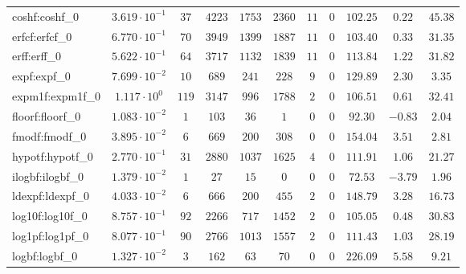 \begin{tabular}{|l|c|c|c|c|c|c|c|c|c|c|}
coshf:coshf\_0               & $ 3.619 \cdot 10^{-1} $ & $ 37     $ & $ 4223  $ & $ 1753  $ & $ 2360  $ & $ 11  $ & $ 0 $ & $ 102.25      $ & $ 0.22    $ & $ 45.38   $ \\
erfcf:erfcf\_0               & $ 6.770 \cdot 10^{-1} $ & $ 70     $ & $ 3949  $ & $ 1399  $ & $ 1887  $ & $ 11  $ & $ 0 $ & $ 103.40      $ & $ 0.33    $ & $ 31.35   $ \\
erff:erff\_0                 & $ 5.622 \cdot 10^{-1} $ & $ 64     $ & $ 3717  $ & $ 1132  $ & $ 1839  $ & $ 11  $ & $ 0 $ & $ 113.84      $ & $ 1.22    $ & $ 31.82   $ \\
expf:expf\_0                 & $ 7.699 \cdot 10^{-2} $ & $ 10     $ & $ 689   $ & $ 241   $ & $ 228   $ & $ 9   $ & $ 0 $ & $ 129.89      $ & $ 2.30    $ & $ 3.35    $ \\
expm1f:expm1f\_0             & $ 1.117 \cdot 10^{0}  $ & $ 119    $ & $ 3147  $ & $ 996   $ & $ 1788  $ & $ 2   $ & $ 0 $ & $ 106.51      $ & $ 0.61    $ & $ 32.41   $ \\
floorf:floorf\_0             & $ 1.083 \cdot 10^{-2} $ & $ 1      $ & $ 103   $ & $ 36    $ & $ 1     $ & $ 0   $ & $ 0 $ & $ 92.30       $ & $ -0.83   $ & $ 2.04    $ \\
fmodf:fmodf\_0               & $ 3.895 \cdot 10^{-2} $ & $ 6      $ & $ 669   $ & $ 200   $ & $ 308   $ & $ 0   $ & $ 0 $ & $ 154.04      $ & $ 3.51    $ & $ 2.81    $ \\
hypotf:hypotf\_0             & $ 2.770 \cdot 10^{-1} $ & $ 31     $ & $ 2880  $ & $ 1037  $ & $ 1625  $ & $ 4   $ & $ 0 $ & $ 111.91      $ & $ 1.06    $ & $ 21.27   $ \\
ilogbf:ilogbf\_0             & $ 1.379 \cdot 10^{-2} $ & $ 1      $ & $ 27    $ & $ 15    $ & $ 0     $ & $ 0   $ & $ 0 $ & $ 72.53       $ & $ -3.79   $ & $ 1.96    $ \\
ldexpf:ldexpf\_0             & $ 4.033 \cdot 10^{-2} $ & $ 6      $ & $ 666   $ & $ 200   $ & $ 455   $ & $ 2   $ & $ 0 $ & $ 148.79      $ & $ 3.28    $ & $ 16.73   $ \\
log10f:log10f\_0             & $ 8.757 \cdot 10^{-1} $ & $ 92     $ & $ 2266  $ & $ 717   $ & $ 1452  $ & $ 2   $ & $ 0 $ & $ 105.05      $ & $ 0.48    $ & $ 30.83   $ \\
log1pf:log1pf\_0             & $ 8.077 \cdot 10^{-1} $ & $ 90     $ & $ 2766  $ & $ 1013  $ & $ 1557  $ & $ 2   $ & $ 0 $ & $ 111.43      $ & $ 1.03    $ & $ 28.19   $ \\
logbf:logbf\_0               & $ 1.327 \cdot 10^{-2} $ & $ 3      $ & $ 162   $ & $ 63    $ & $ 70    $ & $ 0   $ & $ 0 $ & $ 226.09      $ & $ 5.58    $ & $ 9.21    $ \\

\end{tabular}
